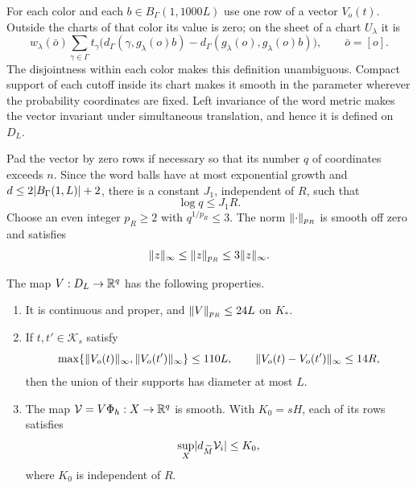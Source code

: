 For each color and each $b\in B_\Gamma(1,1000L)$ use one row of a
vector $V_o(t)$.  Outside the charts of that color its value is zero;
on the sheet of a chart $U_\lambda$ it is
\begin{equation}
\label{eq:distance-profile-row}
 w_\lambda(\bar o)\sum_{\gamma\in\Gamma}t_\gamma
 \bigl(d_\Gamma(\gamma,g_\lambda(o)b)
             -d_\Gamma(g_\lambda(o),g_\lambda(o)b)\bigr),
 \qquad \bar o=[o].
\end{equation}
The disjointness within each color makes this definition unambiguous.
Compact support of each cutoff inside its chart makes it smooth in
the parameter wherever the probability coordinates are fixed.  Left
invariance of the word metric makes the vector invariant under
simultaneous translation, and hence it is defined on $D_L$.

Pad the vector by zero rows if necessary so that its number $q$ of
coordinates exceeds $n$.  Since the word balls have at most exponential
growth and $d\le2\lvert B_\Gamma(1,L)\rvert+2$, there is a constant $J_1$,
independent of $R$, such that
\begin{equation}
\label{eq:profile-count}
 \log q\le J_1R.
\end{equation}
Choose an even integer $p_R\ge2$ with $q^{1/p_R}\le3$.  The norm
$\lVert\cdot\rVert_{p_R}$ is smooth off zero and satisfies
\begin{equation}
\label{eq:profile-norms}
 \lVert z\rVert_\infty\le\lVert z\rVert_{p_R}\le3\lVert z\rVert_\infty.
\end{equation}

\begin{lemma}
\label{lem:distance-profiles}
The map $V:D_L\to\mathbb R^q$ has the following properties.
\begin{enumerate}
\item It is continuous and proper, and
$\lVert V\rVert_{p_R}\le24L$ on $K_*$.
\item If $t,t'\in\mathcal K_s$ satisfy
\[
 \max\{\lVert V_o(t)\rVert_\infty,\lVert V_o(t')\rVert_\infty\}\le110L,
 \qquad
 \lVert V_o(t)-V_o(t')\rVert_\infty\le14R,
\]
then the union of their supports has diameter at most $L$.
\item The map
$\mathcal V=V\Phi_h:X\to\mathbb R^q$ is smooth.  With $K_0=sH$,
each of its rows satisfies
\[
 \sup_X\lvert d_{\widetilde M}\mathcal V_i\rvert\le K_0,
\]
where $K_0$ is independent of $R$.
\end{enumerate}
\end{lemma}

